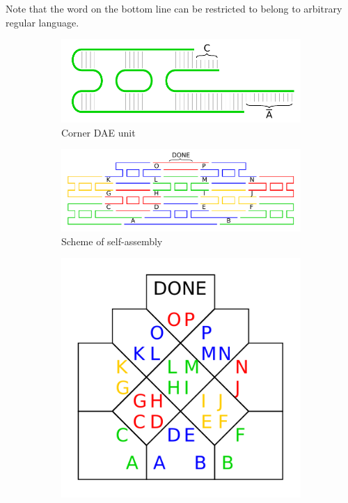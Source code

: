Note that the word on the bottom line can be restricted to belong to arbitrary regular language.


\begin{figure}[h]
\begin{center}
	\begin{subfigure}[b]{0.31\textwidth}
		\includegraphics[width=\textwidth]{./figures/tile_model/DNA_struct.pdf} %
		\caption{Corner DAE unit}
		\label{fig:DNA_struct}
	\end{subfigure}
	\begin{subfigure}[b]{0.472\textwidth}
		\includegraphics[width=\textwidth]{./figures/tile_model/DNA_assembly.pdf} %
		\caption{Scheme of self-assembly}
		\label{fig:DNA_assembly}
	\end{subfigure}
	\begin{subfigure}[b]{0.190\textwidth}
		\includegraphics[width=\textwidth]{./figures/tile_model/abstract_model.pdf} %

\end{subfigure}
\end{center}
\end{figure}
